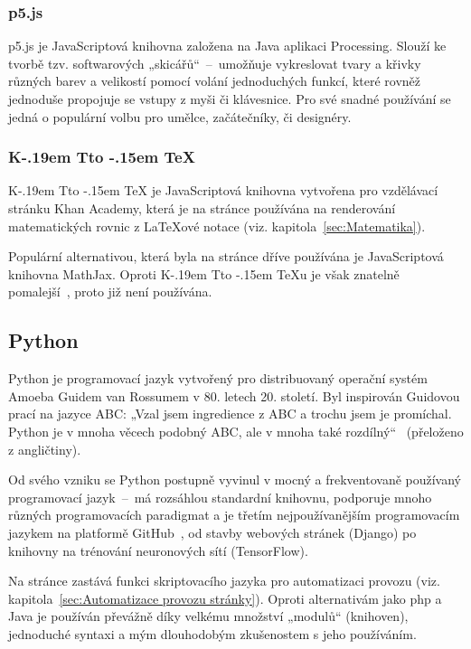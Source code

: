 \documentclass[a4paper, 12pt, twoside]{article}
\makeatletter
\DeclareRobustCommand{\KaTeX}{%
  K\kern -.19em
  {\sbox \z@ T\vbox to\ht \z@ {\hbox{%
  \check@mathfonts
  \fontsize\sf@size\z@
  \selectfont A}%
  \vss}%
}\kern -.15em
\TeX}
\makeatother
\begin{document}
  \subsubsection{p5.js} \label{sec:p5.js}
  p5.js je JavaScriptová knihovna založena na Java aplikaci Processing. Slouží ke tvorbě tzv. softwarových „skicářů“~--~umožňuje vykreslovat tvary a křivky různých barev a velikostí pomocí volání jednoduchých funkcí, které rovněž jednoduše propojuje se vstupy z myši či klávesnice. Pro své snadné používání se jedná o populární volbu pro umělce, začátečníky, či designéry.


  \subsubsection{\texorpdfstring{\KaTeX}{KaTeX}} \label{sec:KaTeX}
  \KaTeX{} je JavaScriptová knihovna vytvořena pro vzdělávací stránku Khan Academy, která je na stránce používána na renderování matematických rovnic z \LaTeX ové notace (viz. kapitola~\ref{sec:Matematika}).

  Populární alternativou, která byla na stránce dříve používána je JavaScriptová knihovna MathJax. Oproti \KaTeX u je však znatelně pomalejší~\cite{katex-mathjax-comparison}, proto již není používána.


  \subsection{Python} \label{sec:Python}
  Python je programovací jazyk vytvořený pro distribuovaný operační systém Amoeba Guidem van Rossumem v 80. letech 20. století. Byl inspirován Guidovou prací na jazyce ABC: „Vzal jsem ingredience z ABC a trochu jsem je promíchal. Python je v mnoha věcech podobný ABC, ale v mnoha také rozdílný“~\cite{making-of-python} (přeloženo z angličtiny).

  Od svého vzniku se Python postupně vyvinul v mocný a frekventovaně používaný programovací jazyk~--~má rozsáhlou standardní knihovnu, podporuje mnoho různých programovacích paradigmat a je třetím nejpoužívanějším programovacím jazykem na platformě GitHub~\cite{github-statistics}, od stavby webových stránek (Django) po knihovny na trénování neuronových sítí (TensorFlow).

  Na stránce zastává funkci skriptovacího jazyka pro automatizaci provozu (viz. kapitola~\ref{sec:Automatizace provozu stránky}). Oproti alternativám jako \gls{php} a Java je používán převážně díky velkému množství „modulů“ (knihoven), jednoduché syntaxi a mým dlouhodobým zkušenostem s jeho používáním.
\end{document}
